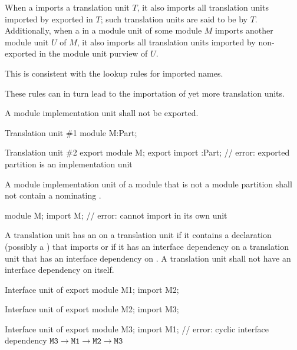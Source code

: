 \pnum
When a  imports
a translation unit $T$, it also imports
all translation units imported by
exported 
in $T$; such translation units are
said to be  by $T$.
Additionally, when a 
in a module unit of some module $M$ imports another module unit $U$ of $M$,
it also imports all translation units imported by
non-exported 
in the module unit purview of $U$.
\begin{footnote}
This is consistent
with the lookup rules for imported names.
\end{footnote}
These rules can in turn lead to the importation of yet more
translation units.

\pnum
A module implementation unit shall not be exported.
\begin{example}
\begin{codeblocktu}{Translation unit \#1}
module M:Part;
\end{codeblocktu}

\begin{codeblocktu}{Translation unit \#2}
export module M;
export import :Part;    // error: exported partition  is an implementation unit
\end{codeblocktu}
\end{example}

\pnum
A module implementation unit of a module 
that is not a module partition
shall not contain a 
nominating .
\begin{example}
\begin{codeblock}
module M;
import M;               // error: cannot import  in its own unit
\end{codeblock}
\end{example}

\pnum
A translation unit has an  on a translation unit 
if it contains a declaration (possibly a )
that imports  or if it has
an interface dependency on a translation unit that has an interface dependency on .
A translation unit shall not have an interface dependency on itself.
\begin{example}
\begin{codeblocktu}{Interface unit of }
export module M1;
import M2;
\end{codeblocktu}

\begin{codeblocktu}{Interface unit of }
export module M2;
import M3;
\end{codeblocktu}

\begin{codeblocktu}{Interface unit of }
export module M3;
import M1;              // error: cyclic interface dependency $\mathtt{M3} \rightarrow \mathtt{M1} \rightarrow \mathtt{M2} \rightarrow \mathtt{M3}$
\end{codeblocktu}
\end{example}

